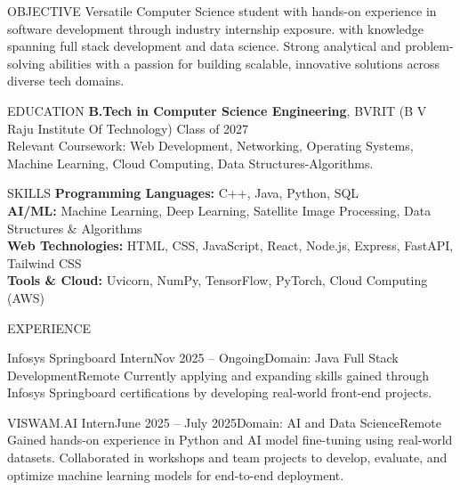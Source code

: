 \documentclass{resume}
\begin{document}
\vspace{-0.6em}
\begin{rSection}{OBJECTIVE}
Versatile Computer Science student with hands-on experience in software development through industry internship exposure.  with knowledge spanning full stack development and data science. Strong analytical and problem-solving abilities with a passion for building scalable, innovative solutions across diverse tech domains.
\end{rSection}

\vspace{-1.05em}
\begin{rSection}{EDUCATION}
{\bf B.Tech in Computer Science Engineering}, BVRIT (B V Raju Institute Of Technology) \hfill {Class of 2027}\\
Relevant Coursework: Web Development, Networking, Operating Systems, Machine Learning, Cloud Computing, Data Structures-Algorithms.
\end{rSection}

\vspace{-1.05em}
\begin{rSection}{SKILLS}
\textbf{Programming Languages:} C++, Java, Python, SQL\\
\textbf{AI/ML:} Machine Learning, Deep Learning, Satellite Image Processing, Data Structures \& Algorithms\\
\textbf{Web Technologies:} HTML, CSS, JavaScript, React, Node.js, Express, FastAPI, Tailwind CSS\\
\textbf{Tools \& Cloud:} Uvicorn, NumPy, TensorFlow, PyTorch, Cloud Computing (AWS)
\end{rSection}

\vspace{-1.05em}
\begin{rSection}{EXPERIENCE}
\begin{rSubsection}{Infosys Springboard Intern}{Nov 2025 -- Ongoing}{Domain: Java Full Stack Development}{Remote}
Currently applying and expanding skills gained through Infosys Springboard certifications by developing real-world front-end projects.
\end{rSubsection}
\vspace{-0.5em}

\begin{rSubsection}{VISWAM.AI Intern}{June 2025 -- July 2025}{Domain: AI and Data Science}{Remote}
Gained hands-on experience in Python and AI model fine-tuning using real-world datasets. Collaborated in workshops and team projects to develop, evaluate, and optimize machine learning models for end-to-end deployment.
\end{rSubsection}
\end{rSection}
\end{document}
